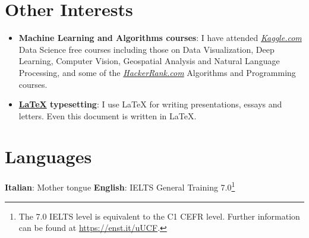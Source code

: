 \documentclass[a4paper,10pt,english]{article} %
\begin{document}
\section{Other Interests}

\begin{itemize}[leftmargin=*]
	\item \textbf{Machine Learning and Algorithms courses}{: I have attended \href{https://www.kaggle.com/enstit/}{\textit{Kaggle.com}} Data Science free courses
		      including those on Data Visualization, Deep Learning, Computer Vision, Geospatial Analysis and Natural Language Processing,
		      and some of the \href{https://www.hackerrank.com/enstit/}{\textit{HackerRank.com}} Algorithms and Programming courses.}\vspace{-2pt}
	\item \textbf{\href{https://www.latex-project.org}{\LaTeX} typesetting}{: I use \LaTeX{} for writing presentations, essays and letters. Even this document is written in \LaTeX{}.}\vspace{-2pt}
\end{itemize}

\section{Languages}
\textbf{Italian}{: Mother tongue}
\hfill
\textbf{English}{: IELTS General Training 7.0\footnote{The 7.0 IELTS level is equivalent to the C1 CEFR level. Further information can be found at \url{https://enst.it/uUCF}.}}

\end{document}
